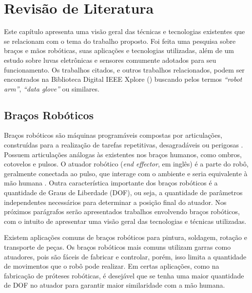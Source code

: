 \chapter{Revisão de Literatura}
\label{ch:revisao}

\vspace{-1.9cm}

Este capítulo apresenta uma visão geral das técnicas e tecnologias existentes que se relacionam com o tema do trabalho proposto. Foi feita uma pesquisa sobre braços e mãos robóticas, suas aplicações e tecnologias utilizadas, além de um estudo sobre luvas eletrônicas e sensores comumente adotados para seu funcionamento. Os trabalhos citados, e outros trabalhos relacionados, podem ser encontrados na Biblioteca Digital IEEE Xplore () buscando pelos termos \textit{``robot arm''}, \textit{``data glove''} ou similares.

\section{Braços Robóticos}
\label{sec:brac}
Braços robóticos são máquinas programáveis compostas por articulações, construídas para a realização de tarefas repetitivas, desagradáveis ou perigosas \cite{occupational1996osha}. Possuem articulações análogas às existentes nos braços humanos, como ombros, cotovelos e pulsos. O atuador robótico (\textit{end effector}, em inglês) é a parte do robô, geralmente conectada ao pulso, que interage com o ambiente e seria equivalente à mão humana \cite{end_effect}. Outra característica importante dos braços robóticos é a quantidade de Graus de Liberdade (\ac{DOF}), ou seja, a quantidade de parâmetros independentes necessários para determinar a posição final do atuador. Nos próximos parágrafos serão apresentados trabalhos envolvendo braços robóticos, com o intuito de apresentar uma visão geral das tecnologias e técnicas utilizadas.

Existem aplicações comuns de braços robóticos para pintura, soldagem, rotação e transporte de peças. Os braços robóticos mais comuns utilizam garras como atuadores, pois são fáceis de fabricar e controlar, porém, isso limita a quantidade de movimentos que o robô pode realizar. Em certas aplicações, como na fabricação de próteses robóticas, é desejável que se tenha uma maior quantidade de \ac{DOF} no atuador para garantir maior similaridade com a mão humana.

